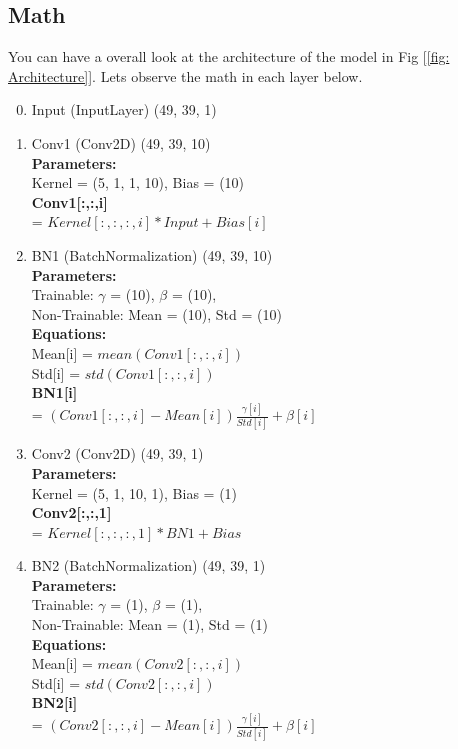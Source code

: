 \documentclass[11pt,english]{article}
\begin{document}
\subsection{Math}
You can have a overall look at the architecture of the model in Fig [\ref{fig: Architecture}]. Lets observe the math in each layer below.
\begin{enumerate}
    \setcounter{enumi}{-1}
    \item Input (InputLayer) (49, 39, 1)
    
    \item Conv1 (Conv2D)                    (49, 39, 10)\\
    \textbf{Parameters:} \\
    Kernel = (5, 1, 1, 10),  Bias = (10)\\
    \textbf{Conv1[:,:,i]} \\
    = $Kernel[:,:,:,i] * Input + Bias[i]$
    
    \item BN1 (BatchNormalization)          (49, 39, 10)\\
    \textbf{Parameters:} \\
    Trainable: $\gamma$ = (10), $\beta$ = (10), \\
    Non-Trainable: Mean = (10), Std = (10)\\
    \textbf{Equations:} \\
    Mean[i] = $mean(Conv1[:,:,i])$\\
    Std[i] = $std(Conv1[:,:,i])$\\
    \textbf{BN1[i]} \\
    = $(Conv1[:,:,i]-Mean[i]) \frac{\gamma[i]}{Std[i]} + \beta[i]$
                  
    \item Conv2 (Conv2D)                    (49, 39, 1)\\
    \textbf{Parameters:} \\
    Kernel = (5, 1, 10, 1),  Bias = (1)\\
    \textbf{Conv2[:,:,1]}\\ 
    = $Kernel[:,:,:,1] * BN1 + Bias$
                  
    \item BN2 (BatchNormalization)          (49, 39, 1)\\
    \textbf{Parameters:} \\
    Trainable: $\gamma$ = (1), $\beta$ = (1), \\
    Non-Trainable: Mean = (1), Std = (1)\\
    \textbf{Equations:} \\
    Mean[i] = $mean(Conv2[:,:,i])$\\
    Std[i] = $std(Conv2[:,:,i])$\\
    \textbf{BN2[i]} \\
    = $(Conv2[:,:,i]-Mean[i]) \frac{\gamma[i]}{Std[i]} + \beta[i]$
    

\end{enumerate}
\end{document}
